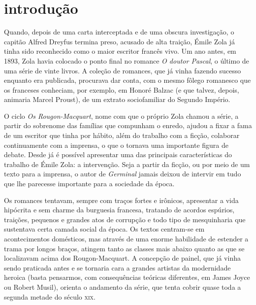 \newcommand\legendas[1]{\begin{footnotesize}#1\end{footnotesize}}

\chapter[Introdução, por Ricardo Lísias]{introdução}

Quando, depois de uma carta interceptada e de uma obscura investigação,
o capitão Alfred Dreyfus termina preso, acusado de alta traição, Émile
Zola já tinha sido reconhecido como o maior escritor francês vivo. Um
ano antes, em 1893, Zola havia colocado o ponto final no romance
\textit{O doutor Pascal}, o último de uma série de vinte livros. A
coleção de romances, que já vinha fazendo sucesso enquanto era
publicada, procurava dar conta, com o mesmo fôlego romanesco que os
franceses conheciam, por exemplo, em Honoré Balzac (e que talvez,
depois, animaria Marcel Proust), de um extrato sociofamiliar do Segundo Império. 

O ciclo \textit{Os Rougon-Macquart}, nome com que o próprio Zola chamou a
série, a partir do sobrenome das famílias que compunham o enredo,
ajudou a fixar a fama de um escritor que tinha por hábito, além do
trabalho com a ficção, colaborar continuamente com a imprensa, o que o
tornava uma importante figura de debate. Desde já é possível apresentar
uma das principais características do trabalho de Émile Zola: a
intervenção. Seja a partir da ficção, ou por meio de um texto para a
imprensa, o autor de \textit{Germinal} jamais deixou de intervir em
tudo que lhe parecesse importante para a sociedade da época. 

Os romances tentavam, sempre com traços fortes e irônicos, apresentar a
vida hipócrita e sem charme da burguesia francesa, tratando de acordos
espúrios, traições, pequenos e grandes atos de corrupção e todo tipo de
mesquinharia que sustentava certa camada social da época. Os textos
centram-se em acontecimentos domésticos, mas através de uma enorme
habilidade de estender a trama por longos braços, atingem tanto as
classes mais abaixo quanto as que se localizavam acima dos
Rougon-Macquart. A concepção de painel, que já vinha sendo praticada
antes e se tornaria cara a grandes artistas da modernidade heroica
(basta pensarmos, com consequências teóricas diferentes, em James Joyce
ou Robert Musil), orienta o andamento da série, que tenta cobrir quase
toda a segunda metade do século \textsc{xix}. 

